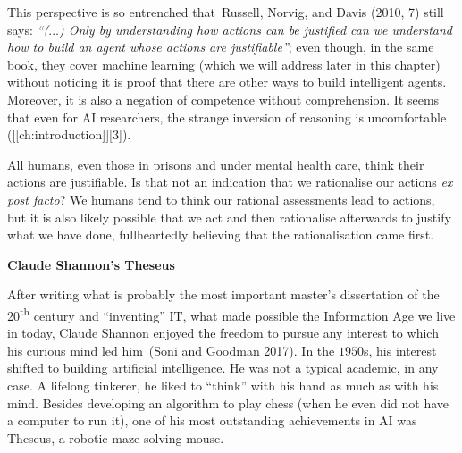 \documentclass[
  letterpaper,
  12pt,
  british]{tufte-book}
\theoremstyle{plain}
\theoremstyle{plain}
\theoremstyle{definition}
\theoremstyle{remark}
\begin{document}
This perspective is so entrenched that~Russell, Norvig, and Davis (2010,
7)
still says: \emph{``(\(\ldots\)) Only by understanding how actions can
be justified can we understand how to build an agent whose actions are
justifiable''}; even though, in the same book, they cover machine
learning (which we will address later in this chapter) without noticing
it is proof that there are other ways to build intelligent agents.
Moreover, it is also a negation of competence without comprehension. It
seems that even for AI researchers, the strange inversion of reasoning
is uncomfortable ({[}{[}ch:introduction{]}{]}{[}3{]}).

All humans, even those in prisons and under mental health care, think
their actions are justifiable. Is that not an indication that we
rationalise our actions \emph{ex post facto}? We humans tend to think
our rational assessments lead to actions, but it is also likely possible
that we act and then rationalise afterwards to justify what we have
done, fullheartedly believing that the rationalisation came first.

\textbf{Claude Shannon's Theseus}

After writing what is probably the most important master's dissertation
of the 20\textsuperscript{th} century and ``inventing'' {IT}, what made
possible the Information Age we live in today, Claude Shannon enjoyed
the freedom to pursue any interest to which his curious mind led
him~(Soni and Goodman
2017).
In the \(1950\)s, his interest shifted to building artificial
intelligence. He was not a typical academic, in any case. A lifelong
tinkerer, he liked to ``think'' with his hand as much as with his mind.
Besides developing an algorithm to play chess (when he even did not have
a computer to run it), one of his most outstanding achievements in AI
was Theseus, a robotic maze-solving mouse.
\end{document}
